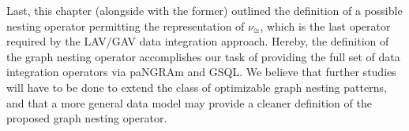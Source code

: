 Last, this chapter (alongside with the former) outlined the definition of a possible nesting operator permitting the representation of $\nu_\cong$, which is the last operator required by the LAV/GAV data integration approach. Hereby, the definition of the graph nesting operator accomplishes our task of providing the full set of data integration operators via paNGRAm and GSQL. We believe that further studies will have to be done to extend the class of optimizable graph nesting patterns, and that a more general data model may provide a cleaner definition of the proposed graph nesting operator. 